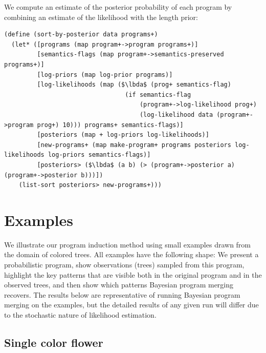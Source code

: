 \documentclass[a4paper,10pt]{article}
\newcommand{\lbda}{\color[rgb]{0,.3,.7} \lambda}
\begin{document}
We compute an estimate of the posterior probability of each program by combining an estimate of the likelihood with the length prior:
\begin{lstlisting}[frame=trbl]
(define (sort-by-posterior data programs+)
  (let* ([programs (map program+->program programs+)]
         [semantics-flags (map program+->semantics-preserved programs+)]
         [log-priors (map log-prior programs)]
         [log-likelihoods (map ($\lbda$ (prog+ semantics-flag)
                                 (if semantics-flag
                                     (program+->log-likelihood prog+)
                                     (log-likelihood data (program+->program prog+) 10))) programs+ semantics-flags)]
         [posteriors (map + log-priors log-likelihoods)] 
         [new-programs+ (map make-program+ programs posteriors log-likelihoods log-priors semantics-flags)]
         [posteriors> ($\lbda$ (a b) (> (program+->posterior a) (program+->posterior b)))])
    (list-sort posteriors> new-programs+)))
\end{lstlisting}


\newpage
\section{Examples}

We illustrate our program induction method using small examples drawn from the domain of colored trees. All examples have the following shape: We present a probabilistic program, show observations (trees) sampled from this program, highlight the key patterns that are visible both in the original program and in the observed trees, and then show which patterns Bayesian program merging recovers.  The results below are representative of running Bayesian program merging on the examples, but the detailed results of any given run will differ due to the stochastic nature of likelihood estimation.

\subsection{Single color flower}
\end{document}
